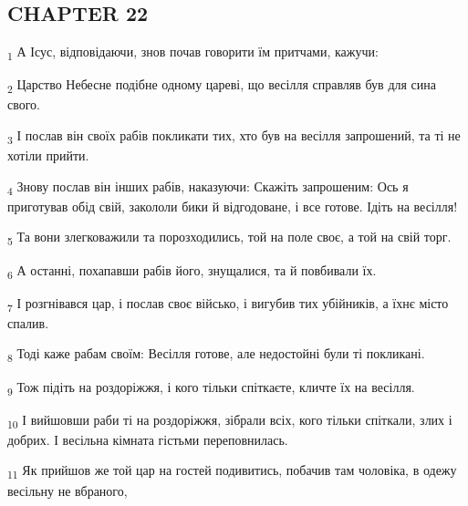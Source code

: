 \subsection{CHAPTER 22}
\begin{tcolorbox}
\textsubscript{1} А Ісус, відповідаючи, знов почав говорити їм притчами, кажучи:
\end{tcolorbox}
\begin{tcolorbox}
\textsubscript{2} Царство Небесне подібне одному цареві, що весілля справляв був для сина свого.
\end{tcolorbox}
\begin{tcolorbox}
\textsubscript{3} І послав він своїх рабів покликати тих, хто був на весілля запрошений, та ті не хотіли прийти.
\end{tcolorbox}
\begin{tcolorbox}
\textsubscript{4} Знову послав він інших рабів, наказуючи: Скажіть запрошеним: Ось я приготував обід свій, закололи бики й відгодоване, і все готове. Ідіть на весілля!
\end{tcolorbox}
\begin{tcolorbox}
\textsubscript{5} Та вони злегковажили та порозходились, той на поле своє, а той на свій торг.
\end{tcolorbox}
\begin{tcolorbox}
\textsubscript{6} А останні, похапавши рабів його, знущалися, та й повбивали їх.
\end{tcolorbox}
\begin{tcolorbox}
\textsubscript{7} І розгнівався цар, і послав своє військо, і вигубив тих убійників, а їхнє місто спалив.
\end{tcolorbox}
\begin{tcolorbox}
\textsubscript{8} Тоді каже рабам своїм: Весілля готове, але недостойні були ті покликані.
\end{tcolorbox}
\begin{tcolorbox}
\textsubscript{9} Тож підіть на роздоріжжя, і кого тільки спіткаєте, кличте їх на весілля.
\end{tcolorbox}
\begin{tcolorbox}
\textsubscript{10} І вийшовши раби ті на роздоріжжя, зібрали всіх, кого тільки спіткали, злих і добрих. І весільна кімната гістьми переповнилась.
\end{tcolorbox}
\begin{tcolorbox}
\textsubscript{11} Як прийшов же той цар на гостей подивитись, побачив там чоловіка, в одежу весільну не вбраного,
\end{tcolorbox}
